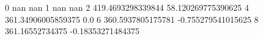 0 nan nan
1 nan nan
2 419.4693298339844 58.120269775390625
4 361.34906005859375 0.0
6 360.5937805175781 -0.755279541015625
8 361.16552734375 -0.18353271484375
